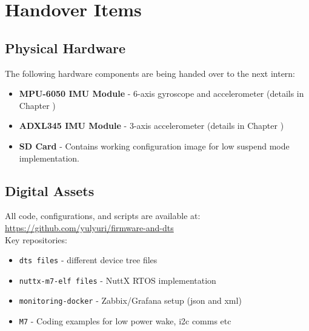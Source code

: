 \documentclass[12pt,a4paper]{report}
\begin{document}


\section{Handover Items}

\subsection{Physical Hardware}
\begin{hardware}
The following hardware components are being handed over to the next intern:
\begin{itemize}
    \item \textbf{MPU-6050 IMU Module} - 6-axis gyroscope and accelerometer (details in Chapter )
    \item \textbf{ADXL345 IMU Module} - 3-axis accelerometer (details in Chapter )
    \item \textbf{SD Card } - Contains working configuration image for low suspend mode implementation. 
\end{itemize}
\end{hardware}

\subsection{Digital Assets}
\begin{gitref}
All code, configurations, and scripts are available at: \\
\url{https://github.com/yulyuri/firmware-and-dts} \\
\vspace{0.2cm}
Key repositories:
\begin{itemize}
    \item \texttt{dts files} - different device tree files
    \item \texttt{nuttx-m7-elf files} - NuttX RTOS implementation
    \item \texttt{monitoring-docker} - Zabbix/Grafana setup (json and xml)
    \item \texttt{M7} - Coding examples for low power wake, i2c comms etc
\end{itemize}
\end{gitref}
\end{document}
